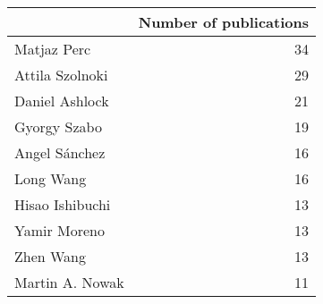 \begin{tabular}{lr}
\toprule
{} &  Number of publications \\
\midrule
Matjaz Perc     &                      34 \\
Attila Szolnoki &                      29 \\
Daniel Ashlock  &                      21 \\
Gyorgy Szabo    &                      19 \\
Angel Sánchez   &                      16 \\
Long Wang       &                      16 \\
Hisao Ishibuchi &                      13 \\
Yamir Moreno    &                      13 \\
Zhen Wang       &                      13 \\
Martin A. Nowak &                      11 \\
\bottomrule
\end{tabular}
